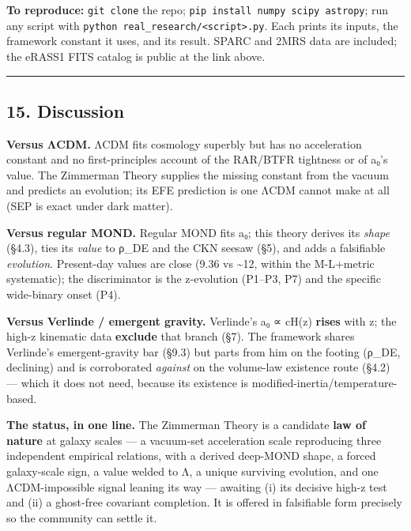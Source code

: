 \documentclass[
]{article}
\begin{document}
\textbf{To reproduce:} \texttt{git\ clone} the repo;
\texttt{pip\ install\ numpy\ scipy\ astropy}; run any script with
\texttt{python\ real\_research/\textless{}script\textgreater{}.py}. Each
prints its inputs, the framework constant it uses, and its result. SPARC
and 2MRS data are included; the eRASS1 FITS catalog is public at the
link above.

\begin{center}\rule{0.5\linewidth}{0.5pt}\end{center}

\subsection{15. Discussion}\label{discussion}

\textbf{Versus ΛCDM.} ΛCDM fits cosmology superbly but has no
acceleration constant and no first-principles account of the RAR/BTFR
tightness or of a₀'s value. The Zimmerman Theory supplies the missing
constant from the vacuum and predicts an evolution; its EFE prediction
is one ΛCDM cannot make at all (SEP is exact under dark matter).

\textbf{Versus regular MOND.} Regular MOND fits a₀; this theory derives
its \emph{shape} (§4.3), ties its \emph{value} to ρ\_DE and the CKN
seesaw (§5), and adds a falsifiable \emph{evolution}. Present-day values
are close (9.36 vs \textasciitilde12, within the M-L+metric systematic);
the discriminator is the z-evolution (P1--P3, P7) and the specific
wide-binary onset (P4).

\textbf{Versus Verlinde / emergent gravity.} Verlinde's a₀ ∝ cH(z)
\textbf{rises} with z; the high-z kinematic data \textbf{exclude} that
branch (§7). The framework shares Verlinde's emergent-gravity bar (§9.3)
but parts from him on the footing (ρ\_DE, declining) and is corroborated
\emph{against} on the volume-law existence route (§4.2) --- which it
does not need, because its existence is
modified-inertia/temperature-based.

\textbf{The status, in one line.} The Zimmerman Theory is a candidate
\textbf{law of nature} at galaxy scales --- a vacuum-set acceleration
scale reproducing three independent empirical relations, with a derived
deep-MOND shape, a forced galaxy-scale sign, a value welded to Λ, a
unique surviving evolution, and one ΛCDM-impossible signal leaning its
way --- awaiting (i) its decisive high-z test and (ii) a ghost-free
covariant completion. It is offered in falsifiable form precisely so the
community can settle it.
\end{document}
